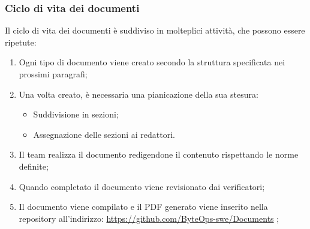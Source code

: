 \documentclass{article}
\begin{document}
\subsubsection{Ciclo di vita dei documenti}
Il ciclo di vita dei documenti è suddiviso in molteplici attività, che possono essere ripetute:
\begin{enumerate}
    \item  Ogni tipo di documento viene creato secondo la struttura specificata nei prossimi paragrafi;
    \item Una volta creato, è necessaria una pianicazione della sua stesura: 
    \begin{itemize}
        \item Suddivisione in sezioni;
        \item Assegnazione delle sezioni ai redattori.
    \end{itemize}
    \item Il team realizza il documento redigendone il contenuto rispettando le norme definite;
    \item Quando completato il documento viene revisionato dai verificatori;
    \item Il documento viene compilato e il PDF generato viene inserito nella repository all'indirizzo: \href{https://github.com/ByteOps-swe/Documents} {https://github.com/ByteOps-swe/Documents} ;
\end{enumerate}

   
\end{document}
